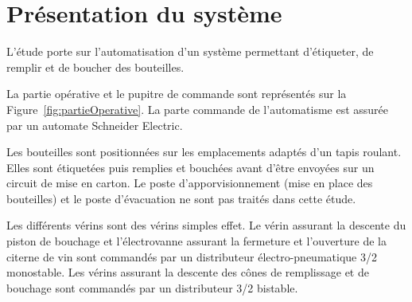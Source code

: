 \documentclass[11pt, multicol]{article}
\begin{document}
\UPSTIbuildPage



\tableofcontents
\section{Présentation du système}
L'étude porte sur l'automatisation d'un système permettant d'étiqueter, de remplir et de boucher des bouteilles. 

La partie opérative et le pupitre de commande sont représentés sur la Figure~\ref{fig:partieOperative}. La parte commande de l'automatisme est assurée par un automate Schneider Electric.

Les bouteilles sont positionnées sur les emplacements adaptés d'un tapis roulant. Elles sont étiquetées puis remplies et bouchées avant d'être envoyées sur un circuit de mise en carton. 
Le poste d'apporvisionnement (mise en place des bouteilles) et le poste d'évacuation ne sont pas traités dans cette étude. 

Les différents vérins sont des vérins simples effet. Le vérin assurant la descente du piston de bouchage et l'électrovanne assurant la fermeture et l'ouverture de la citerne de vin sont commandés par un distributeur électro-pneumatique 3/2 monostable. 
Les vérins assurant la descente des cônes de remplissage et de bouchage sont commandés par un distributeur 3/2 bistable. 
\end{document}

